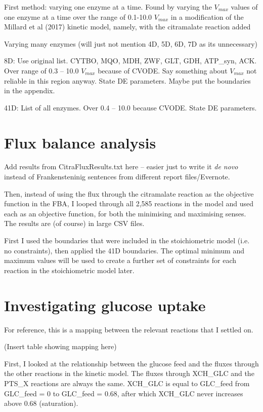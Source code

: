 \documentclass[parskip=full]{scrreprt}
\begin{document}
First method: varying one enzyme at a time. Found by varying the $V_{max}$ values of one enzyme at a time over the range of 0.1-10.0 $V_{max}$ in a modification of the Millard et al (2017) kinetic model, namely, with the citramalate reaction added

Varying many enzymes (will just not mention 4D, 5D, 6D, 7D as its unnecessary)

8D: Use original list. CYTBO, MQO, MDH, ZWF, GLT, GDH, ATP\_syn, ACK. Over range of 0.3 -- 10.0 $V_{max}$ because of CVODE. Say something about $V_{max}$ not reliable in this region anyway. State DE parameters. Maybe put the boundaries in the appendix.

41D: List of all enzymes. Over 0.4 -- 10.0 because CVODE. State DE parameters.

\section{Flux balance analysis}
\label{sec:fba}

Add results from CitraFluxResults.txt here -- easier just to write it \emph{de novo} instead of Frankensteninig sentences from different report files/Evernote.

Then, instead of using the flux through the citramalate reaction as the objective function in the FBA, I looped through all 2,585 reactions in the model and used each as an objective function, for both the minimising and maximising senses. The results are (of course) in large CSV files.

First I used the boundaries that were included in the stoichiometric model (i.e. no constraints), then applied the 41D boundaries. The optimal minimum and maximum values will be used to create a further set of constraints for each reaction in the stoichiometric model later.

\section{Investigating glucose uptake}
\label{sec:glucoseuptake}

For reference, this is a mapping between the relevant reactions that I settled on.

(Insert table showing mapping here)

First, I looked at the relationship between the glucose feed and the fluxes through the other reactions in the kinetic model. The fluxes through XCH\_GLC and the PTS\_X reactions are always the same. XCH\_GLC is equal to GLC\_feed from GLC\_feed = 0 to GLC\_feed = 0.68, after which XCH\_GLC never increases above 0.68 (saturation).
\end{document}
